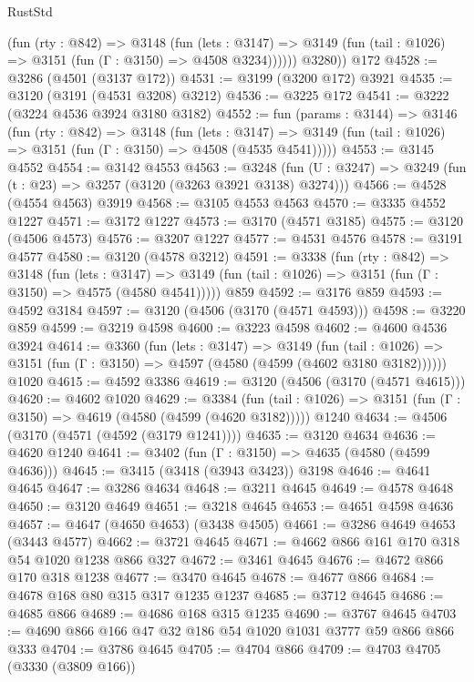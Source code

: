\begin{lexlean}{RustStd}
\begin{coremodule}
            (fun (rty : @842) =>
            @3148
              (fun (lets : @3147) =>
              @3149 (fun (tail : @1026) => @3151 (fun (Γ : @3150) => @4508 @3234))))))
        @3280))
    @172
@4528 := @3286 (@4501 (@3137 @172))
@4531 := @3199 (@3200 @172) @3921
@4535 := @3120 (@3191 (@4531 @3208) @3212)
@4536 := @3225 @172
@4541 := @3222 (@3224 @4536 @3924 @3180 @3182)
@4552 := fun (params : @3144) =>
  @3146
    (fun (rty : @842) =>
    @3148
      (fun (lets : @3147) =>
      @3149 (fun (tail : @1026) => @3151 (fun (Γ : @3150) => @4508 (@4535 @4541)))))
@4553 := @3145 @4552
@4554 := @3142 @4553
@4563 := @3248 (fun (U : @3247) => @3249 (fun (t : @23) => @3257 (@3120 (@3263 @3921 @3138) @3274)))
@4566 := @4528 (@4554 @4563) @3919
@4568 := @3105 @4553 @4563
@4570 := @3335 @4552 @1227
@4571 := @3172 @1227
@4573 := @3170 (@4571 @3185)
@4575 := @3120 (@4506 @4573)
@4576 := @3207 @1227
@4577 := @4531 @4576
@4578 := @3191 @4577
@4580 := @3120 (@4578 @3212)
@4591 := @3338
    (fun (rty : @842) =>
    @3148
      (fun (lets : @3147) =>
      @3149 (fun (tail : @1026) => @3151 (fun (Γ : @3150) => @4575 (@4580 @4541)))))
    @859
@4592 := @3176 @859
@4593 := @4592 @3184
@4597 := @3120 (@4506 (@3170 (@4571 @4593)))
@4598 := @3220 @859
@4599 := @3219 @4598
@4600 := @3223 @4598
@4602 := @4600 @4536 @3924
@4614 := @3360
    (fun (lets : @3147) =>
    @3149
      (fun (tail : @1026) => @3151 (fun (Γ : @3150) => @4597 (@4580 (@4599 (@4602 @3180 @3182))))))
    @1020
@4615 := @4592 @3386
@4619 := @3120 (@4506 (@3170 (@4571 @4615)))
@4620 := @4602 @1020
@4629 := @3384
    (fun (tail : @1026) => @3151 (fun (Γ : @3150) => @4619 (@4580 (@4599 (@4620 @3182)))))
    @1240
@4634 := @4506 (@3170 (@4571 (@4592 (@3179 @1241))))
@4635 := @3120 @4634
@4636 := @4620 @1240
@4641 := @3402 (fun (Γ : @3150) => @4635 (@4580 (@4599 @4636)))
@4645 := @3415 (@3418 (@3943 @3423)) @3198
@4646 := @4641 @4645
@4647 := @3286 @4634
@4648 := @3211 @4645
@4649 := @4578 @4648
@4650 := @3120 @4649
@4651 := @3218 @4645
@4653 := @4651 @4598 @4636
@4657 := @4647 (@4650 @4653) (@3438 @4505)
@4661 := @3286 @4649 @4653 (@3443 @4577)
@4662 := @3721 @4645
@4671 := @4662 @866 @161 @170 @318 @54 @1020 @1238 @866 @327
@4672 := @3461 @4645
@4676 := @4672 @866 @170 @318 @1238
@4677 := @3470 @4645
@4678 := @4677 @866
@4684 := @4678 @168 @80 @315 @317 @1235 @1237
@4685 := @3712 @4645
@4686 := @4685 @866
@4689 := @4686 @168 @315 @1235
@4690 := @3767 @4645
@4703 := @4690 @866 @166 @47 @32 @186 @54 @1020 @1031 @3777 @59 @866 @866 @333
@4704 := @3786 @4645
@4705 := @4704 @866
@4709 := @4703 @4705 (@3330 (@3809 @166))

\end{coremodule}
\end{lexlean}

